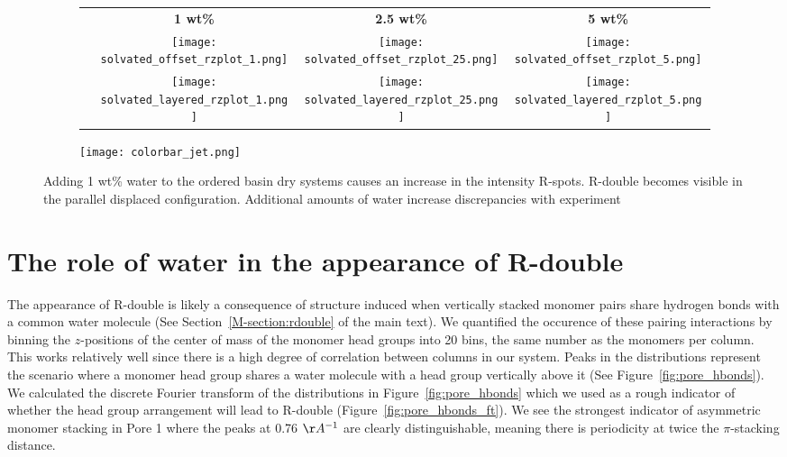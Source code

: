 \documentclass{article}
\begin{document}
  \begin{figure}[!htb]
  \begin{subfigure}{0.915\textwidth}
  	\centering\begin{tabular}{@{}c@{ }c@{ }c@{ }c@{}}
  	&\textbf{1 wt\%} & \textbf{\hspace{2em}2.5 wt\%} & \textbf{5 wt\%} \\
  	\rowname{Parallel Displaced}&
  	\texttt{[image: solvated\_offset\_rzplot\_1.png]}&
  	\texttt{[image: solvated\_offset\_rzplot\_25.png]}&
  	\texttt{[image: solvated\_offset\_rzplot\_5.png]}\\[-1ex]
  	\rowname{Sandwiched}&
  	\texttt{[image: solvated\_layered\_rzplot\_1.png]}&
  	\texttt{[image: solvated\_layered\_rzplot\_25.png]}&
  	\texttt{[image: solvated\_layered\_rzplot\_5.png]}\\[-1ex]
  	\end{tabular}
  \end{subfigure}
  \begin{subfigure}{0.075\textwidth}
  	\texttt{[image: colorbar\_jet.png]}
  \end{subfigure}
	\caption{Adding 1 wt\% water to the ordered basin dry systems causes an increase in the intensity
	R-spots. R-double becomes visible in the parallel displaced configuration. Additional amounts
	of water increase discrepancies with experiment} %
  \label{fig:solvation}

  \end{figure}
  
  \clearpage
  \section{The role of water in the appearance of R-double}\label{section:rdouble}
  
  The appearance of R-double is likely a consequence of structure induced when
  vertically stacked monomer pairs share hydrogen bonds with a common water molecule (See
  Section~\ref{M-section:rdouble} of the main text). We quantified the occurence of
  these pairing interactions by binning the $z$-positions of the center of mass of 
  the monomer head groups into 20 bins, the same number as the monomers per column. 
  This works relatively well since there is a high degree of correlation between
  columns in our system. Peaks in the distributions represent the scenario where a monomer head group
  shares a water molecule with a head group vertically above it (See Figure~\ref{fig:pore_hbonds}).
  We calculated the discrete Fourier transform of the distributions in Figure~\ref{fig:pore_hbonds}
  which we used as a rough indicator of whether the head group arrangement will lead to R-double
  (Figure~\ref{fig:pore_hbonds_ft}). We see the strongest indicator of asymmetric monomer
  stacking in Pore 1 where the peaks at 0.76 $\AA^{-1}$ are clearly distinguishable, meaning
  there is periodicity at twice the $\pi$-stacking distance.
  
\end{document}
